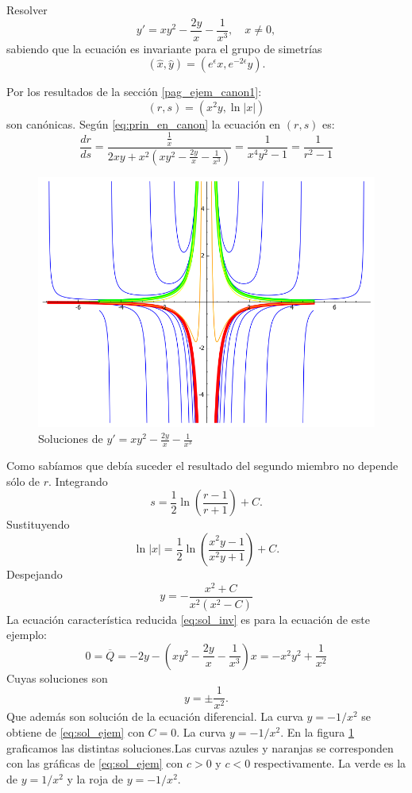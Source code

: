 \begin{ejemplo}{} Resolver
\[y'=xy^2-\frac{2y}{x}-\frac{1}{x^3},\quad x\neq 0,\]
sabiendo que la ecuación es invariante para el grupo de simetrías
\[(\hat{x},\hat{y})=(e^{\epsilon}x,e^{-2\epsilon}y).\]
\end{ejemplo}
Por los resultados de la sección \ref{pag_ejem_canon1}:
\[(r,s)=(x^2y,\ln|x|)\]
son canónicas. Según \eqref{eq:prin_en_canon} la ecuación en $(r,s)$ es:
\[\frac{dr}{ds}=\frac{\frac{1}{x}}{2xy+x^2\left(  xy^2-\frac{2y}{x}-\frac{1}{x^3}     \right)}=\frac{1}{x^4y^2-1}=\frac{1}{r^2-1}\]
\begin{figure}
\begin{center}
\includegraphics[scale=.3]{imagenes/SolGrup.png}
\caption{Soluciones de  $y'=xy^2-\frac{2y}{x}-\frac{1}{x^3}$}\label{fig:sol_met_lie}
\end{center}
\end{figure}
Como sabíamos que debía suceder el resultado del segundo miembro no depende sólo de $r$. Integrando
\[s=\frac12\ln\left( \frac{r-1}{r+1}  \right)+C.\]
Sustituyendo
\[\ln|x|=\frac12\ln\left( \frac{x^2y-1}{x^2y+1}  \right)+C.\]
Despejando
\begin{equation}\label{eq:sol_ejem}y =-\frac{x^2 + C}{x^2(x^2 - C)}\end{equation}
La ecuación característica reducida \eqref{eq:sol_inv} es para la ecuación de este ejemplo:
\[0=\overline{Q}=-2y- \left(xy^2-\frac{2y}{x}-\frac{1}{x^3}  \right)x=-x^2y^2+\frac{1}{x^2}\]
Cuyas soluciones son
\[y=\pm\frac{1}{x^2}.\]
Que además son solución de la ecuación diferencial. La curva $y=-1/x^2$ se obtiene de \eqref{eq:sol_ejem} con $C=0$. La  curva $y=-1/x^2$. En la figura \ref{fig:sol_met_lie} graficamos las distintas soluciones.Las curvas azules y naranjas se corresponden con las gráficas de \eqref{eq:sol_ejem} con $c>0$ y $c<0$ respectivamente. La verde es la de $y=1/x^2$ y la roja de $y=-1/x^2$.









